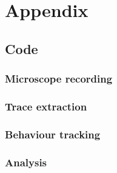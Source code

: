 \chapter{Appendix}
\section{Code}
\subsection{Microscope recording}
\subsection{Trace extraction}
\subsection{Behaviour tracking}
\subsection{Analysis}
